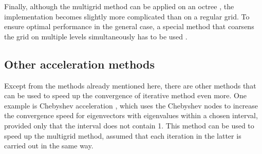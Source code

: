 Finally, although the multigrid method can be applied on an octree \citep{Popinet2003,Ji2012}, the implementation becomes slightly more complicated than on a regular grid. To ensure optimal performance in the general case, a special method that coarsens the grid on multiple levels simultaneously has to be used \citep{Popinet2003}.

\subsection{Other acceleration methods}

Except from the methods already mentioned here, there are other methods that can be used to speed up the convergence of iterative method even more. One example is Chebyshev acceleration \citep{Auzinger2011}, which uses the Chebyshev nodes to increase the convergence speed for eigenvectors with eigenvalues within a chosen interval, provided only that the interval does not contain 1. This method can be used to speed up the multigrid method, assumed that each iteration in the latter is carried out in the same way.




%
%

